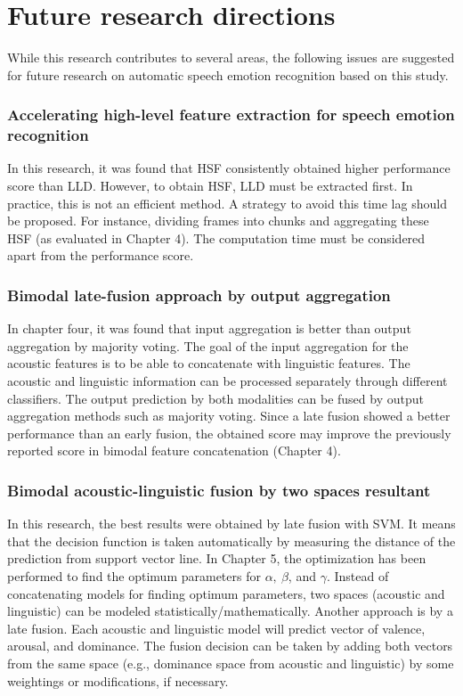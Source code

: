 \section{Future research directions}
While this research contributes to several areas, the following issues are
suggested for future research on automatic speech emotion recognition based on
this study.

\subsubsection{Accelerating high-level feature extraction for  
speech emotion recognition} In this research, it was found that HSF
consistently obtained higher performance score than LLD. However, to obtain
HSF, LLD must be extracted first. In practice, this is not an efficient method.
A strategy to avoid this time lag should be proposed. For instance, dividing
frames into chunks and aggregating these HSF (as evaluated in Chapter 4). The
computation time must be considered apart from the performance score.

\subsubsection{Bimodal late-fusion approach by output aggregation}
In chapter four, it was found that input aggregation is better than output
aggregation by majority voting. The goal of the input aggregation for the
acoustic features is to be able to concatenate with linguistic features. The
acoustic and linguistic information can be processed separately through
different classifiers. The output prediction by both modalities can be fused by
output aggregation methods such as majority voting. Since a late fusion showed
a better performance than an early fusion, the obtained score may improve the
previously reported score in bimodal feature concatenation (Chapter 4).

\subsubsection{Bimodal acoustic-linguistic fusion by two spaces resultant}
In this research, the best results were obtained by late fusion with SVM. It
means that the decision function is taken automatically by measuring the
distance of the prediction from support vector line. In Chapter 5, the
optimization has been performed to find the optimum parameters for $\alpha,
~\beta$, and $\gamma$. Instead of concatenating models for finding optimum
parameters, two spaces (acoustic and linguistic) can be modeled
statistically/mathematically. Another approach is by a late fusion. Each
acoustic and linguistic model will predict vector of valence, arousal, and
dominance.  The fusion decision can be taken by adding both vectors from the
same space (e.g., dominance space from acoustic and linguistic) by some
weightings or modifications, if necessary. 


